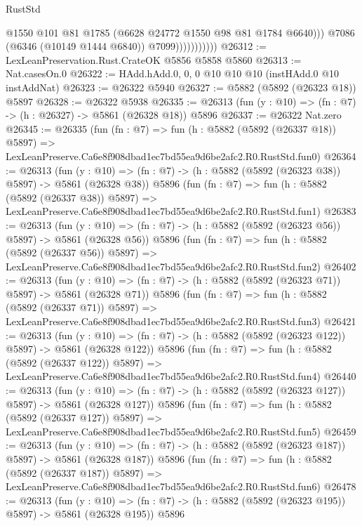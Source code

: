 \begin{lexlean}{RustStd}
\begin{coremodule}
                              @1550
                              @101
                              @81
                              @1785
                              (@6628 @24772 @1550 @98 @81 @1784 @6640)))
                          @7086
                          (@6346 (@10149 @1444 @6840))
                          @7099)))))))))))
@26312 := LexLeanPreservation.Rust.CrateOK @5856 @5858 @5860
@26313 := Nat.casesOn.{0}
@26322 := HAdd.hAdd.{0, 0, 0} @10 @10 @10 (instHAdd.{0} @10 instAddNat)
@26323 := @26322 @5940
@26327 := @5882 (@5892 (@26323 @18)) @5897
@26328 := @26322 @5938
@26335 := @26313 (fun (y : @10) => (fn : @7) -> (h : @26327) -> @5861 (@26328 @18)) @5896
@26337 := @26322 Nat.zero
@26345 := @26335
    (fun (fn : @7) =>
    fun (h : @5882 (@5892 (@26337 @18)) @5897) =>
    LexLeanPreserve.Ca6e8f908dbad1ec7bd55ea9d6be2afc2.R0.RustStd.fun0)
@26364 := @26313
    (fun (y : @10) => (fn : @7) -> (h : @5882 (@5892 (@26323 @38)) @5897) -> @5861 (@26328 @38))
    @5896
    (fun (fn : @7) =>
    fun (h : @5882 (@5892 (@26337 @38)) @5897) =>
    LexLeanPreserve.Ca6e8f908dbad1ec7bd55ea9d6be2afc2.R0.RustStd.fun1)
@26383 := @26313
    (fun (y : @10) => (fn : @7) -> (h : @5882 (@5892 (@26323 @56)) @5897) -> @5861 (@26328 @56))
    @5896
    (fun (fn : @7) =>
    fun (h : @5882 (@5892 (@26337 @56)) @5897) =>
    LexLeanPreserve.Ca6e8f908dbad1ec7bd55ea9d6be2afc2.R0.RustStd.fun2)
@26402 := @26313
    (fun (y : @10) => (fn : @7) -> (h : @5882 (@5892 (@26323 @71)) @5897) -> @5861 (@26328 @71))
    @5896
    (fun (fn : @7) =>
    fun (h : @5882 (@5892 (@26337 @71)) @5897) =>
    LexLeanPreserve.Ca6e8f908dbad1ec7bd55ea9d6be2afc2.R0.RustStd.fun3)
@26421 := @26313
    (fun (y : @10) => (fn : @7) -> (h : @5882 (@5892 (@26323 @122)) @5897) -> @5861 (@26328 @122))
    @5896
    (fun (fn : @7) =>
    fun (h : @5882 (@5892 (@26337 @122)) @5897) =>
    LexLeanPreserve.Ca6e8f908dbad1ec7bd55ea9d6be2afc2.R0.RustStd.fun4)
@26440 := @26313
    (fun (y : @10) => (fn : @7) -> (h : @5882 (@5892 (@26323 @127)) @5897) -> @5861 (@26328 @127))
    @5896
    (fun (fn : @7) =>
    fun (h : @5882 (@5892 (@26337 @127)) @5897) =>
    LexLeanPreserve.Ca6e8f908dbad1ec7bd55ea9d6be2afc2.R0.RustStd.fun5)
@26459 := @26313
    (fun (y : @10) => (fn : @7) -> (h : @5882 (@5892 (@26323 @187)) @5897) -> @5861 (@26328 @187))
    @5896
    (fun (fn : @7) =>
    fun (h : @5882 (@5892 (@26337 @187)) @5897) =>
    LexLeanPreserve.Ca6e8f908dbad1ec7bd55ea9d6be2afc2.R0.RustStd.fun6)
@26478 := @26313
    (fun (y : @10) => (fn : @7) -> (h : @5882 (@5892 (@26323 @195)) @5897) -> @5861 (@26328 @195))
    @5896

\end{coremodule}
\end{lexlean}

